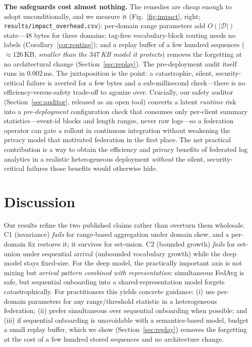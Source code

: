 \documentclass[journal]{IEEEtran}
\begin{document}
\textbf{The safeguards cost almost nothing.} The remedies are cheap enough to adopt unconditionally,
and we measure it (Fig.~\ref{fig:impact}, right; \texttt{results/impact\_overhead.csv}): per-domain
range parameters add $O(|\mathcal{D}|)$ state---$48$ bytes for three domains; tag-free
vocabulary-block routing needs no labels (Corollary~\ref{cor:routing}); and a replay buffer of a few
hundred sequences ($\approx126$\,KB, \emph{smaller than the $347$\,KB model it protects}) removes the
forgetting at no architectural change (Section~\ref{sec:replay}). The pre-deployment audit itself runs
in $0.002$\,ms. The juxtaposition is the point: a catastrophic, silent, security-critical failure is
averted for a few bytes and a sub-millisecond check---there is no efficiency-versus-safety trade-off to
agonize over. Crucially, our safety auditor
(Section~\ref{sec:auditor}, released as an open tool) converts a latent \emph{runtime} risk into a
\emph{pre-deployment} configuration check that consumes only per-client summary statistics---event-id
blocks and length ranges, never raw logs---so a federation operator can gate a rollout in continuous
integration without weakening the privacy model that motivated federation in the first place. The net
practical contribution is a way to obtain the efficiency and privacy benefits of federated log analytics
in a realistic heterogeneous deployment \emph{without} the silent, security-critical failures those
benefits would otherwise hide.

\section{Discussion}
Our results refine the two published claims rather than overturn them wholesale. C1 (invariance)
\emph{fails} for range-based aggregation under domain skew, and a per-domain fix restores it; it
survives for set-union. C2 (bounded growth) \emph{fails} for set-union under sequential arrival
(unbounded vocabulary growth) while the deep model stays fixed-size. For the deep model, the
practically important axis is not mixing but \emph{arrival pattern combined with representation}:
simultaneous FedAvg is safe, but sequential onboarding into a shared-representation model forgets
catastrophically. For practitioners this yields concrete guidance: (i) use per-domain parameters for
any range/threshold statistic in a heterogeneous federation; (ii) prefer simultaneous over sequential
onboarding when possible; and (iii) if sequential onboarding is unavoidable with a semantics-based
model, budget a small replay buffer, which we show (Section~\ref{sec:replay}) removes the forgetting
at the cost of a few hundred stored sequences and no architecture change.
\end{document}
